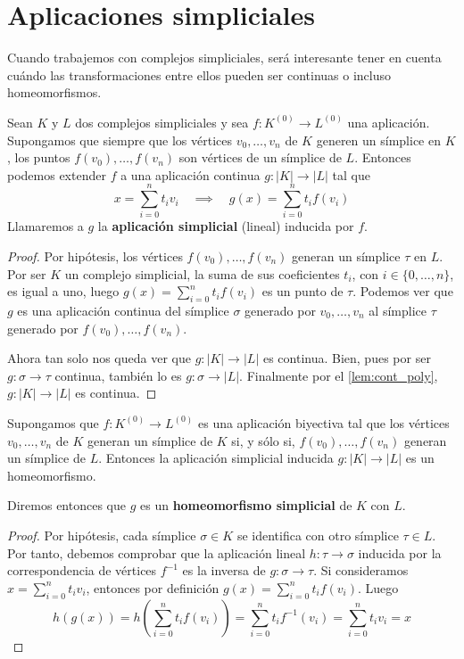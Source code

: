 \section{Aplicaciones simpliciales}

Cuando trabajemos con complejos simpliciales, será interesante tener en cuenta cuándo las 
transformaciones entre ellos pueden ser continuas o incluso homeomorfismos. 

\begin{lema}
	Sean $K$ y $L$ dos complejos simpliciales y sea $f: K^{(0)} \rightarrow L^{(0)}$ una aplicación. 
	Supongamos que siempre que los vértices $v_0, \dots, v_n$ de $K$ generen un símplice en $K$, 
	los puntos $f(v_0), \dots, f(v_n)$ son vértices de un símplice de $L$. Entonces podemos extender $f$ 
	a una aplicación continua $g:|K| \rightarrow |L|$ tal que
	\[ x = \sum_{i=0}^{n}t_iv_i \quad \implies \quad g(x) = \sum_{i=0}^{n}t_if(v_i) \]
	Llamaremos a $g$ la \textbf{aplicación simplicial} (lineal) inducida por $f$.
\end{lema}

\begin{proof}
	Por hipótesis, los vértices $f(v_0), \dots, f(v_n)$ generan un símplice $\tau$ en $L$. Por 
	ser $K$ un complejo simplicial, la suma de sus coeficientes $t_i$, con $i \in \{0, \dots, n\}$,  
	es igual a uno, luego $g(x) = \sum_{i=0}^{n}t_if(v_i)$ es un punto de $\tau$. Podemos ver que 
	$g$ es una aplicación continua del símplice $\sigma$ generado por $v_0, \dots, v_n$ al símplice 
	$\tau$ generado por $f(v_0), \dots, f(v_n)$.
	
	Ahora tan solo nos queda ver que $g:|K| \rightarrow |L|$ es continua. Bien, pues por ser 
	$g: \sigma \rightarrow \tau$ continua, también lo es $g: \sigma \rightarrow |L|$. Finalmente 
	por el \autoref{lem:cont_poly}, $g:|K| \rightarrow |L|$ es continua.
\end{proof}

\begin{lema}\label{lem:homeo_complex}
	Supongamos que $f:K^{(0)} \rightarrow L^{(0)}$ es una aplicación biyectiva tal que los vértices 
	$v_0, \dots, v_n$ de $K$ generan un símplice de $K$ si, y sólo si, $f(v_0), \dots, f(v_n)$ 
	generan un símplice de $L$. Entonces la aplicación simplicial inducida $g:|K| \rightarrow |L|$ 
	es un homeomorfismo.
\end{lema}
Diremos entonces que $g$ es un \textbf{homeomorfismo simplicial} de $K$ con $L$.
\begin{proof}
	Por hipótesis, cada símplice $\sigma \in K$ se identifica con otro símplice $\tau \in L$. 
	Por tanto, debemos comprobar que la aplicación lineal $h: \tau \rightarrow \sigma$ inducida por 
	la correspondencia de vértices $f^{-1}$ es la inversa de $g: \sigma \rightarrow \tau$. Si 
	consideramos $x = \sum_{i=0}^{n}t_i v_i$, entonces por definición $g(x) = \sum_{i=0}^{n}t_if(v_i)$.
	Luego
	\[ h(g(x)) = h(\sum_{i=0}^{n}t_if(v_i)) = \sum_{i=0}^{n}t_i f^{-1}(v_i) = \sum_{i=0}^{n}t_i v_i = x \]
	
\end{proof}

